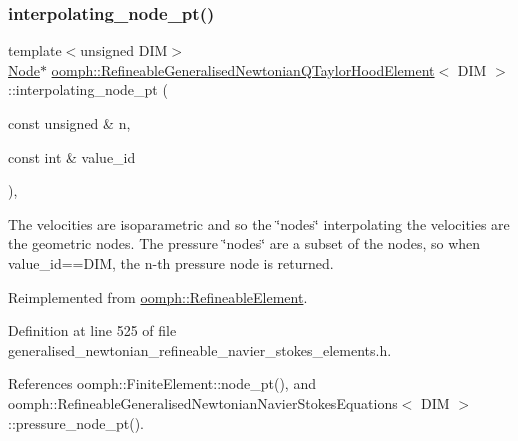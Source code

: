 \subsubsection{\texorpdfstring{interpolating\+\_\+node\+\_\+pt()}{interpolating\_node\_pt()}}
{\footnotesize\ttfamily template$<$unsigned D\+IM$>$ \\
\hyperlink{classoomph_1_1Node}{Node}$\ast$ \hyperlink{classoomph_1_1RefineableGeneralisedNewtonianQTaylorHoodElement}{oomph\+::\+Refineable\+Generalised\+Newtonian\+Q\+Taylor\+Hood\+Element}$<$ D\+IM $>$\+::interpolating\+\_\+node\+\_\+pt (\begin{DoxyParamCaption}\item[{const unsigned \&}]{n,  }\item[{const int \&}]{value\+\_\+id }\end{DoxyParamCaption})\hspace{0.3cm}{\ttfamily [inline]}, {\ttfamily [virtual]}}



The velocities are isoparametric and so the \char`\"{}nodes\char`\"{} interpolating the velocities are the geometric nodes. The pressure \char`\"{}nodes\char`\"{} are a subset of the nodes, so when value\+\_\+id==D\+IM, the n-\/th pressure node is returned. 



Reimplemented from \hyperlink{classoomph_1_1RefineableElement_ab27986fc2f6033a4758662cde78a7b76}{oomph\+::\+Refineable\+Element}.



Definition at line 525 of file generalised\+\_\+newtonian\+\_\+refineable\+\_\+navier\+\_\+stokes\+\_\+elements.\+h.



References oomph\+::\+Finite\+Element\+::node\+\_\+pt(), and oomph\+::\+Refineable\+Generalised\+Newtonian\+Navier\+Stokes\+Equations$<$ D\+I\+M $>$\+::pressure\+\_\+node\+\_\+pt().

\mbox{\label{classoomph_1_1RefineableGeneralisedNewtonianQTaylorHoodElement_ae5eda68a83a1e61082f813c7500b698c}} 

